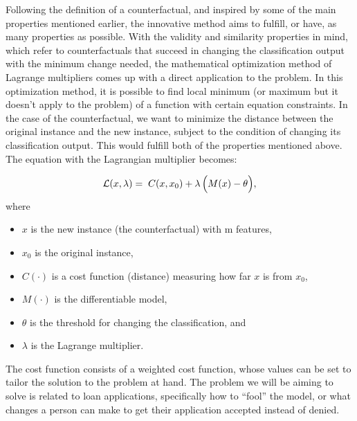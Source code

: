 \documentclass[12pt]{extarticle}
\numberwithin{equation}{section}
\begin{document}
Following the definition of a counterfactual, and inspired by some of the main properties mentioned earlier, the innovative method aims to fulfill, or have, as many properties as possible. With the validity and similarity properties in mind, which refer to counterfactuals that succeed in changing the classification output with the minimum change needed, the mathematical optimization method of Lagrange multipliers comes up with a direct application to the problem. In this optimization method, it is possible to find local minimum (or maximum but it doesn’t apply to the problem) of a function with certain equation constraints. In the case of the counterfactual, we want to minimize the distance between the original instance and the new instance, subject to the condition of changing its classification output. This would fulfill both of the properties mentioned above. The equation with the Lagrangian multiplier becomes:

\[
\mathcal{L}(x, \lambda) = \; C(x, x_0) + \lambda \, \Bigl(M(x) - \theta \Bigr),
\]
where
\begin{itemize}
  \item $x$ is the new instance (the counterfactual) with m features,
  \item $x_0$ is the original instance,
  \item $C(\cdot)$ is a cost function (distance) measuring how far $x$ is from $x_0$,
  \item $M(\cdot)$ is the differentiable model, 
  \item $\theta$ is the threshold for changing the classification, and
  \item $\lambda$ is the Lagrange multiplier.
\end{itemize}
The cost function consists of a weighted cost function, 
whose values can be set to tailor the solution to the problem at hand. The problem we will be 
aiming to solve is related to loan applications, specifically how to “fool” the model, or what 
changes a person can make to get their application accepted instead of denied.
\end{document}
